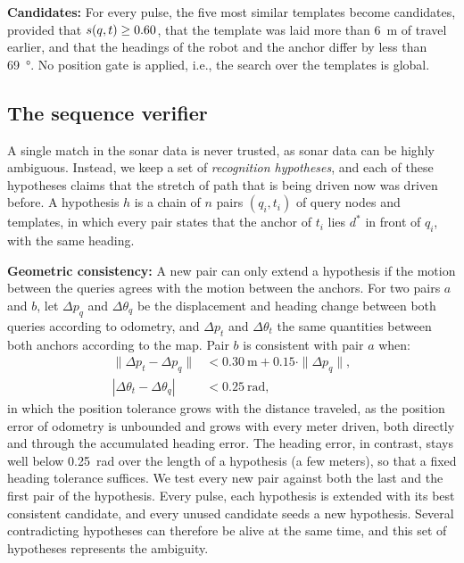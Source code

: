 \textbf{Candidates:} For every pulse, the five most similar templates become candidates, provided that $s(q,t) \ge 0.60$, that the template was laid more than \SI{6}{\meter} of travel earlier, and that the headings of the robot and the anchor differ by less than \SI{69}{\degree}. No position gate is applied, i.e., the search over the templates is global.

\subsection{The sequence verifier}
\label{sec:verifier}
A single match in the sonar data is never trusted, as sonar data can be highly ambiguous. Instead, we keep a set of \emph{recognition hypotheses}, and each of these hypotheses claims that the stretch of path that is being driven now was driven before. A hypothesis $h$ is a chain of $n$ pairs $(q_i, t_i)$ of query nodes and templates, in which every pair states that the anchor of $t_i$ lies $d^*$ in front of $q_i$, with the same heading.

\textbf{Geometric consistency:} A new pair can only extend a hypothesis if the motion between the queries agrees with the motion between the anchors. For two pairs $a$ and $b$, let $\Delta p_q$ and $\Delta\theta_q$ be the displacement and heading change between both queries according to odometry, and $\Delta p_t$ and $\Delta\theta_t$ the same quantities between both anchors according to the map. Pair $b$ is consistent with pair $a$ when:
\begin{equation}
\begin{aligned}
\| \Delta p_t - \Delta p_q \| &< \SI{0.30}{\meter} + 0.15 \cdot \| \Delta p_q \|, \\
|\Delta\theta_t - \Delta\theta_q| &< \SI{0.25}{\radian},
\end{aligned}
\label{eq:consistency}
\end{equation}
%
in which the position tolerance grows with the distance traveled, as the position error of odometry is unbounded and grows with every meter driven, both directly and through the accumulated heading error. The heading error, in contrast, stays well below \SI{0.25}{\radian} over the length of a hypothesis (a few meters), so that a fixed heading tolerance suffices. We test every new pair against both the last and the first pair of the hypothesis. Every pulse, each hypothesis is extended with its best consistent candidate, and every unused candidate seeds a new hypothesis. Several contradicting hypotheses can therefore be alive at the same time, and this set of hypotheses represents the ambiguity.

